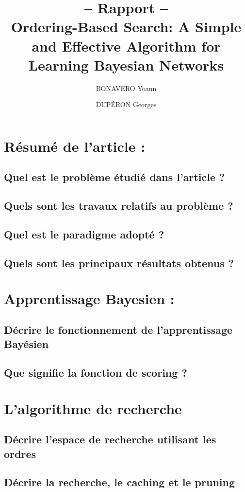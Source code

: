 \documentclass[french,a4paper]{article}
\title{-- Rapport -- \\ Ordering-Based Search: A Simple and Effective Algorithm for Learning Bayesian Networks}
\author{BONAVERO Yoann \and DUPÉRON Georges}
\begin{document}
\maketitle
\newpage
\section{Résumé de l’article :}
\subsection{Quel est le problème étudié dans l’article ?}
\subsection{Quels sont les travaux relatifs au problème ? }
\subsection{Quel est le paradigme adopté ?}
\subsection{Quels sont les principaux résultats obtenus ?}

\section{Apprentissage Bayesien :}
\subsection{Décrire le fonctionnement de l'apprentissage Bayésien}
\subsection{Que signifie la fonction de scoring ?}

\section{L'algorithme de recherche}
\subsection{Décrire l'espace de recherche utilisant les ordres}
\subsection{Décrire la recherche, le caching et le pruning}
\end{document}

